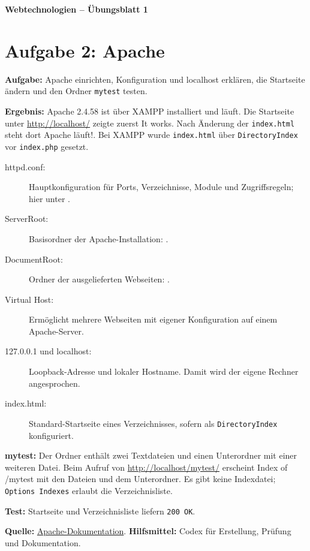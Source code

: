 \documentclass[11pt,a4paper]{article}
\begin{document}
\begin{center}
  {\Large\textbf{Webtechnologien -- Übungsblatt 1}}
\end{center}
\section*{Aufgabe 2: Apache}
\textbf{Aufgabe:} Apache einrichten, Konfiguration und localhost
erklären, die Startseite ändern und den Ordner \texttt{mytest} testen.

\medskip
\textbf{Ergebnis:} Apache 2.4.58 ist über XAMPP installiert und läuft.
Die Startseite unter \url{http://localhost/} zeigte zuerst
\glqq It works\grqq. Nach Änderung der \texttt{index.html}
steht dort \glqq Apache läuft!\grqq.
Bei XAMPP wurde \texttt{index.html} über \texttt{DirectoryIndex}
vor \texttt{index.php} gesetzt.

\begin{description}
  \item[httpd.conf:] Hauptkonfiguration für Ports, Verzeichnisse, Module
    und Zugriffsregeln; hier unter .
  \item[ServerRoot:] Basisordner der Apache-Installation:
    .
  \item[DocumentRoot:] Ordner der ausgelieferten Webseiten:
    .
  \item[Virtual Host:] Ermöglicht mehrere Webseiten mit eigener
    Konfiguration auf einem Apache-Server.
  \item[127.0.0.1 und localhost:] Loopback-Adresse und lokaler Hostname.
    Damit wird der eigene Rechner angesprochen.
  \item[index.html:] Standard-Startseite eines Verzeichnisses,
    sofern als \texttt{DirectoryIndex} konfiguriert.
\end{description}

\textbf{mytest:} Der Ordner  enthält
zwei Textdateien und einen Unterordner mit einer weiteren Datei.
Beim Aufruf von
\url{http://localhost/mytest/} erscheint \glqq Index of /mytest\grqq{}
mit den Dateien und dem Unterordner. Es gibt keine Indexdatei;
\texttt{Options Indexes} erlaubt die Verzeichnisliste.

\medskip
\textbf{Test:} Startseite und Verzeichnisliste liefern \texttt{200 OK}.

\medskip
\textbf{Quelle:} \href{https://httpd.apache.org/docs/2.4/mod/core.html}{Apache-Dokumentation}.
\medskip
{\small \textbf{Hilfsmittel:} Codex für Erstellung, Prüfung und Dokumentation.}
\end{document}
